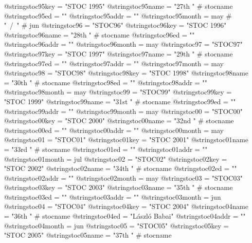 @string{stoc95key =             "STOC 1995"}
@string{stoc95name =            "27th " # stocname}
@string{stoc95ed =              ""}
@string{stoc95addr =            ""}
@string{stoc95month =           may # "~/~" # jun}
@string{stoc96 =                "STOC96"}
@string{stoc96key =             "STOC 1996"}
@string{stoc96name =            "28th " # stocname}
@string{stoc96ed =              ""}
@string{stoc96addr =            ""}
@string{stoc96month =           may}
@string{stoc97 =                "STOC97"}
@string{stoc97key =             "STOC 1997"}
@string{stoc97name =            "29th " # stocname}
@string{stoc97ed =              ""}
@string{stoc97addr =            ""}
@string{stoc97month =           may}
@string{stoc98 =                "STOC98"}
@string{stoc98key =             "STOC 1998"}
@string{stoc98name =            "30th " # stocname}
@string{stoc98ed =              ""}
@string{stoc98addr =            ""}
@string{stoc98month =           may}
@string{stoc99 =                "STOC99"}
@string{stoc99key =             "STOC 1999"}
@string{stoc99name =            "31st " # stocname}
@string{stoc99ed =              ""}
@string{stoc99addr =            ""}
@string{stoc99month =           may}
@string{stoc00 =                "STOC00"}
@string{stoc00key =             "STOC 2000"}
@string{stoc00name =            "32nd " # stocname}
@string{stoc00ed =              ""}
@string{stoc00addr =            ""}
@string{stoc00month =           may}
@string{stoc01 =                "STOC01"}
@string{stoc01key =             "STOC 2001"}
@string{stoc01name =            "33rd " # stocname}
@string{stoc01ed =              ""}
@string{stoc01addr =            ""}
@string{stoc01month =           jul}
@string{stoc02 =                "STOC02"}
@string{stoc02key =             "STOC 2002"}
@string{stoc02name =            "34th " # stocname}
@string{stoc02ed =              ""}
@string{stoc02addr =            ""}
@string{stoc02month =           may}
@string{stoc03 =                "STOC03"}
@string{stoc03key =             "STOC 2003"}
@string{stoc03name =            "35th " # stocname}
@string{stoc03ed =              ""}
@string{stoc03addr =            ""}
@string{stoc03month =           jun}
@string{stoc04 =                "STOC04"}
@string{stoc04key =             "STOC 2004"}
@string{stoc04name =            "36th " # stocname}
@string{stoc04ed =              "L{\'a}szl{\'o} Babai"}
@string{stoc04addr =            ""}
@string{stoc04month =           jun}
@string{stoc05 =                "STOC05"}
@string{stoc05key =             "STOC 2005"}
@string{stoc05name =            "37th " # stocname}
